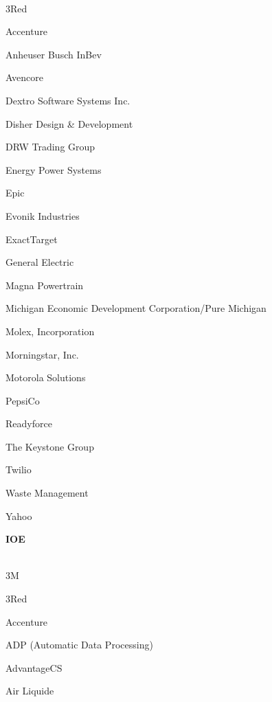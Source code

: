 \documentclass[twoside]{article}
\begin{document}
\begin{center}
\begin{multicols}{5}
        \vspace{-1em}
        ~\hrulefill~
        \vspace{-.9em}
        \begin{FlushLeft}
        \begin{compactitem}
        \item 3Red
\item Accenture
\item Anheuser Busch InBev
\item Avencore
\item Dextro Software Systems Inc.
\item Disher Design \& Development
\item DRW Trading Group
\item Energy Power Systems
\item Epic
\item Evonik Industries
\item ExactTarget
\item General Electric
\item Magna Powertrain
\item Michigan Economic Development Corporation/Pure Michigan
\item Molex, Incorporation
\item Morningstar, Inc.
\item Motorola Solutions
\item PepsiCo
\item Readyforce
\item The Keystone Group
\item Twilio
\item Waste Management
\item Yahoo
\end{compactitem}
        \end{FlushLeft}
        \vspace{1em}
        {\fontsize{14}{16}\selectfont \bf IOE}\\
        \vspace{-1em}
        ~\hrulefill~
        \vspace{-.9em}
        \begin{FlushLeft}
        \begin{compactitem}
        \item 3M
\item 3Red
\item Accenture
\item ADP (Automatic Data Processing)
\item AdvantageCS
\item Air Liquide

\end{compactitem}
\end{FlushLeft}
\end{multicols}
\end{center}
\end{document}
